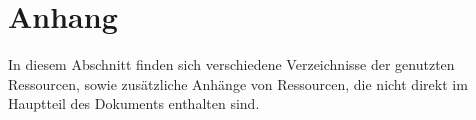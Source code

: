 \documentclass{article}
\newcommand{\listofcode}{
  \doublespacing
  \listof{Code}{Quelltextverzeichnis}
}
\begin{document}

\newpage

\section{Anhang}

In diesem Abschnitt finden sich verschiedene Verzeichnisse der genutzten 
Ressourcen, sowie zusätzliche Anhänge von Ressourcen, die nicht direkt im 
Hauptteil des Dokuments enthalten sind.

\listoffigures

\end{document}
